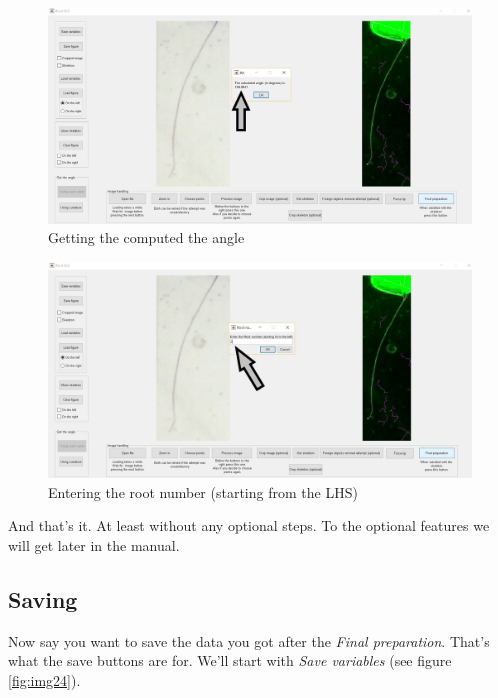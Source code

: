 \begin{figure}[H]
	\centering
	\includegraphics[width=\textwidth]{../Figures/manual/step19.jpg}
	\caption{Getting the computed the angle}
	\label{fig:img22}
\end{figure}

\begin{figure}[H]
	\centering
	\includegraphics[width=\textwidth]{../Figures/manual/step20.jpg}
	\caption{Entering the root number (starting from the LHS)}
	\label{fig:img23}
\end{figure}

And that's it. At least without any optional steps. To the optional features we will get later in the manual. 


\subsection{Saving}

Now say you want to save the data you got after the \textit{Final preparation}. That's what the save buttons are for.
We'll start with \textit{Save variables} (see figure \ref{fig:img24}).

